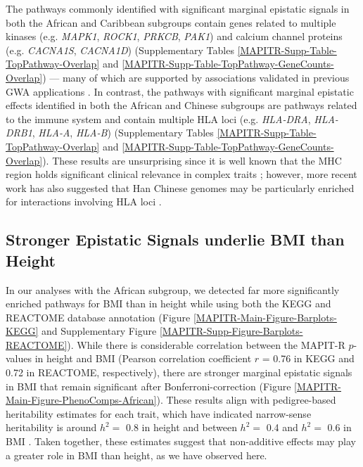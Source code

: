 \documentclass[10pt]{article}
\begin{document}
The pathways commonly identified with significant marginal epistatic signals in both the African and Caribbean subgroups contain genes related to multiple kinases (e.g. \textit{MAPK1}, \textit{ROCK1}, \textit{PRKCB}, \textit{PAK1}) and calcium channel proteins (e.g. \textit{CACNA1S}, \textit{CACNA1D}) (Supplementary Tables \ref{MAPITR-Supp-Table-TopPathway-Overlap} and \ref{MAPITR-Supp-Table-TopPathway-GeneCounts-Overlap}) --- many of which are supported by associations validated in previous GWA applications \cite{Cousminer2013,Wood2014a}. In contrast, the pathways with significant marginal epistatic effects identified in both the African and Chinese subgroups are pathways related to the immune system and contain multiple HLA loci (e.g. \textit{HLA-DRA}, \textit{HLA-DRB1}, \textit{HLA-A}, \textit{HLA-B}) (Supplementary Tables \ref{MAPITR-Supp-Table-TopPathway-Overlap} and \ref{MAPITR-Supp-Table-TopPathway-GeneCounts-Overlap}). These results are unsurprising since it is well known that the MHC region holds significant clinical relevance in complex traits \cite{Wan2010,Rose2012,Stahl2012,Crawford2018b}; however, more recent work has also suggested that Han Chinese genomes may be particularly enriched for interactions involving HLA loci \cite{Deng2020}. 

\subsection*{Stronger Epistatic Signals underlie BMI than Height}

In our analyses with the African subgroup, we detected far more significantly enriched pathways for BMI than in height while using both the KEGG and REACTOME database annotation (Figure \ref{MAPITR-Main-Figure-Barplots-KEGG} and Supplementary Figure \ref{MAPITR-Supp-Figure-Barplots-REACTOME}). While there is considerable correlation between the MAPIT-R $p$-values in height and BMI (Pearson correlation coefficient $r$ = 0.76 in KEGG and 0.72 in REACTOME, respectively), there are stronger marginal epistatic signals in BMI that remain significant after Bonferroni-correction (Figure \ref{MAPITR-Main-Figure-PhenoComps-African}). These results align with pedigree-based heritability estimates for each trait, which have indicated narrow-sense heritability is around $h^2 =$ 0.8 in height and between $h^2 =$ 0.4 and $h^2 =$ 0.6 in BMI \cite{Elks2012,Visscher2012}. Taken together, these estimates suggest that non-additive effects may play a greater role in BMI than height, as we have observed here.
\end{document}
